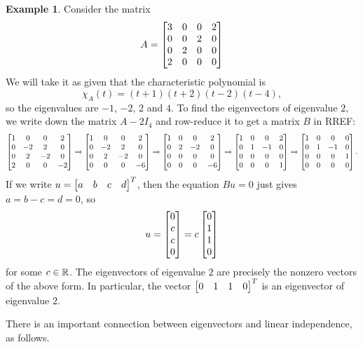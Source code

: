 \documentclass[reqno]{amsart}
\theoremstyle{definition}
\newtheorem{example}[theorem]{Example}
\begin{document}
\begin{example}\label{eg-eigen-v}
 Consider the matrix
 \[ A = \left[\begin{matrix}
         3 & 0 & 0 & 2 \\
         0 & 0 & 2 & 0 \\
         0 & 2 & 0 & 0 \\
         2 & 0 & 0 & 0
        \end{matrix}\right]
 \]
 We will take it as given that the characteristic polynomial is
 \[ \chi_A(t) = (t+1)(t+2)(t-2)(t-4), \]
 so the eigenvalues are $-1$, $-2$, $2$ and $4$.  To find the
 eigenvectors of eigenvalue $2$, we write down the matrix $A-2I_4$ and
 row-reduce it to get a matrix $B$ in RREF:
 \[\left[\begin{matrix}
    1 &  0 &  0 &  2 \\
    0 & -2 &  2 &  0 \\
    0 &  2 & -2 &  0 \\
    2 &  0 &  0 & -2
   \end{matrix}\right]
   \xrightarrow{}
   \left[\begin{matrix}
    1 &  0 &  0 &  2 \\
    0 & -2 &  2 &  0 \\
    0 &  2 & -2 &  0 \\
    0 &  0 &  0 & -6
   \end{matrix}\right]
   \xrightarrow{}
   \left[\begin{matrix}
    1 &  0 &  0 &  2 \\
    0 &  2 & -2 &  0 \\
    0 &  0 &  0 &  0 \\
    0 &  0 &  0 & -6
   \end{matrix}\right]
   \xrightarrow{}
   \left[\begin{matrix}
    1 &  0 &  0 &  2 \\
    0 &  1 & -1 &  0 \\
    0 &  0 &  0 &  0 \\
    0 &  0 &  0 &  1
   \end{matrix}\right]
   \xrightarrow{}
   \left[\begin{matrix}
    1 &  0 &  0 &  0 \\
    0 &  1 & -1 &  0 \\
    0 &  0 &  0 &  1 \\
    0 &  0 &  0 &  0
   \end{matrix}\right].
 \]
 If we write $u=\left[\begin{matrix} a & b & c & d\end{matrix}\right]^T$, then the equation $Bu=0$
 just gives $a=b-c=d=0$, so
 \[ u = \left[\begin{matrix} 0 \\ c \\ c \\ 0 \end{matrix}\right] = c \left[\begin{matrix} 0 \\ 1 \\ 1 \\ 0 \end{matrix}\right] \]
 for some $c\in{\mathbb{R}}$.  The eigenvectors of eigenvalue $2$ are
 precisely the nonzero vectors of the above form.  In particular, the
 vector $\left[\begin{matrix} 0 & 1 & 1 & 0\end{matrix}\right]^T$ is an eigenvector of eigenvalue $2$.
\end{example}

There is an important connection between eigenvectors and linear
independence, as follows.
\end{document}
